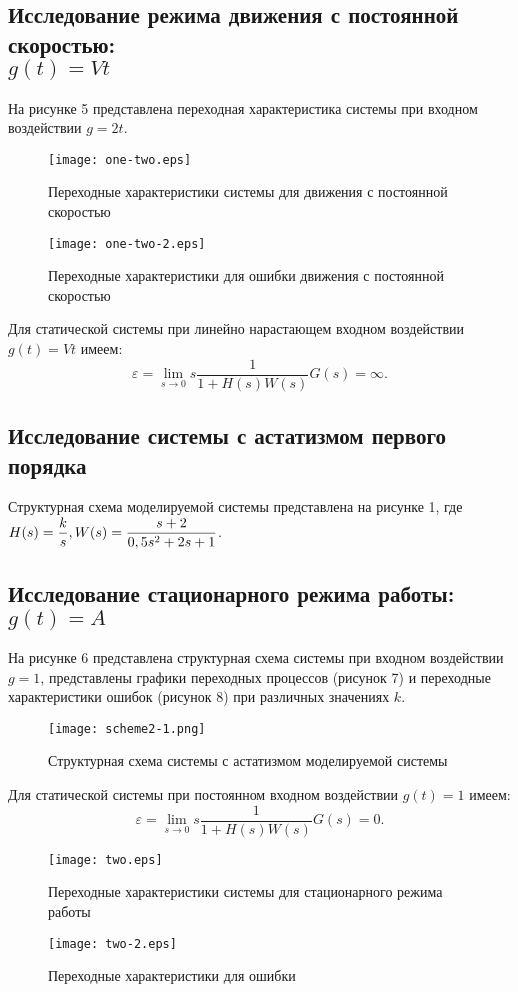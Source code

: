\documentclass[a4paper,12pt]{article} %
\begin{document}
\subsection{Исследование режима движения с постоянной скоростью: \\$g(t)=Vt$} 
На рисунке 5 представлена переходная характеристика системы при входном воздействии $g=2t$.
\begin{figure}[H]
	\centering
	\texttt{[image: one-two.eps]}
	\caption{Переходные характеристики системы для движения с постоянной скоростью}
\end{figure}
\begin{figure}[H]
	\centering
	\texttt{[image: one-two-2.eps]}
	\caption{Переходные характеристики для ошибки движения с постоянной скоростью}
\end{figure}
Для статической системы при линейно нарастающем входном воздействии $g(t)=Vt$ имеем:
\begin{equation}
    \varepsilon = \lim_{s\to0} s\frac{1}{1+H(s)W(s)}G(s) = \infty.
\end{equation}\par
\newpage
\begin{center}
\section{Исследование системы с астатизмом первого порядка}
\end{center}\par
Структурная схема моделируемой системы представлена на рисунке 1, где $H(s) = \displaystyle{\frac{k}{s}},\\W(s)=\displaystyle{\frac{s+2}{0,5s^2+2s+1}}$.

\subsection{Исследование стационарного режима работы: $g(t)=A$} 
На рисунке 6 представлена структурная схема системы при входном воздействии \\$g=1$, представлены графики переходных процессов (рисунок 7) и переходные характеристики ошибок (рисунок 8) при различных значениях $k$. 
\begin{figure}[H]
	\centering
	\texttt{[image: scheme2-1.png]}
	\caption{Структурная схема системы с астатизмом моделируемой системы}
\end{figure}
Для статической системы при постоянном входном воздействии $g(t)=1$ имеем:
\begin{equation}
    \varepsilon = \lim_{s\to0} s\frac{1}{1+H(s)W(s)}G(s) = 0.
\end{equation}
\begin{figure}[H]
	\centering
	\texttt{[image: two.eps]}
	\caption{Переходные характеристики системы для стационарного режима работы}
\end{figure}
\begin{figure}[H]
	\centering
	\texttt{[image: two-2.eps]}
	\caption{Переходные характеристики для ошибки}
\end{figure}
\end{document}
